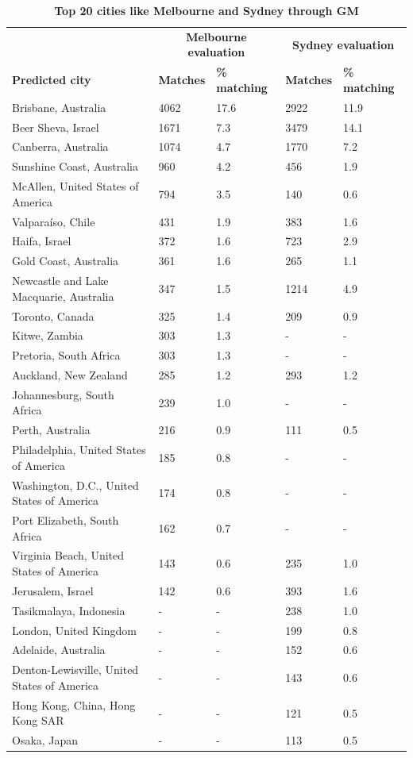 \documentclass[10pt,letterpaper,hidelinks]{article}
\begin{document}
\begin{table}[!htbp]
\begin{adjustwidth}{-2.25in}{0in}
\caption{\bf Top 20 cities like Melbourne and Sydney through GM \label{tab:melbournesydneyGM}}     
\begin{tabular}{ l l l l l}
 \hline    &  \multicolumn{2}{c}{\textbf{Melbourne evaluation}} & \multicolumn{2}{c}{\textbf{Sydney evaluation}}  \\  
\textbf{Predicted city} & \textbf{Matches} & \textbf{\% matching}  & \textbf{Matches} & \textbf{\% matching}\\ \hline

Brisbane, Australia & 4062 & 17.6 & 2922 & 11.9      \\ 
Beer Sheva, Israel & 1671 & 7.3 & 3479 & 14.1      \\ 
Canberra, Australia & 1074 & 4.7 & 1770 & 7.2      \\
Sunshine Coast, Australia & 960 & 4.2 & 456 & 1.9      \\
McAllen, United States of America & 794 & 3.5 & 140 & 0.6      \\
Valpara\'{i}so, Chile & 431 & 1.9 & 383 & 1.6      \\
Haifa, Israel & 372 & 1.6 & 723 & 2.9      \\
Gold Coast, Australia & 361 & 1.6 & 265 & 1.1      \\
Newcastle and Lake Macquarie, Australia & 347 & 1.5 & 1214 & 4.9      \\
Toronto, Canada & 325 & 1.4 & 209 & 0.9      \\
Kitwe, Zambia & 303 & 1.3 & - & -      \\
Pretoria, South Africa & 303 & 1.3 & - & -      \\
Auckland, New Zealand & 285 & 1.2 & 293 & 1.2      \\
Johannesburg, South Africa & 239 & 1.0 & - & -      \\
Perth, Australia & 216 & 0.9 & 111 & 0.5      \\
Philadelphia, United States of America & 185 & 0.8 & - & -      \\
Washington, D.C., United States of America & 174 & 0.8 & - & -      \\
Port Elizabeth, South Africa & 162 & 0.7 & - & -      \\
Virginia Beach, United States of America & 143 & 0.6 & 235 & 1.0      \\
Jerusalem, Israel & 142 & 0.6 & 393 & 1.6      \\
Tasikmalaya, Indonesia & - & - & 238 & 1.0      \\		
London, United Kingdom & - & - & 199 & 0.8      \\
Adelaide, Australia & - & - & 152 & 0.6      \\
Denton-Lewisville, United States of America & - & - & 143 & 0.6      \\						
Hong Kong, China, Hong Kong SAR & - & - & 121 & 0.5      \\		
Osaka, Japan & - & - & 113 & 0.5      \\


\end{tabular}
\end{adjustwidth}
\end{table}
\end{document}
